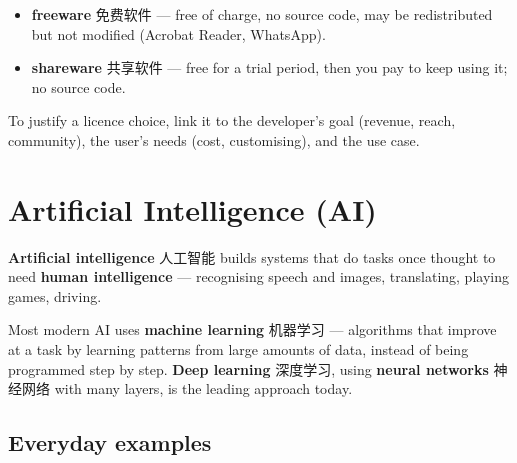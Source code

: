 \documentclass[11pt]{article}
\begin{document}
\begin{itemize}
\item \textbf{freeware} 免费软件 — free of charge, no source code, may be redistributed but not modified (Acrobat Reader, WhatsApp).

\item \textbf{shareware} 共享软件 — free for a trial period, then you pay to keep using it; no source code.

\end{itemize}

\begin{center}
\end{center}

To justify a licence choice, link it to the developer's goal (revenue, reach, community), the user's needs (cost, customising), and the use case.

\section*{Artificial Intelligence (AI)}

\textbf{Artificial intelligence} 人工智能 builds systems that do tasks once thought to need \textbf{human intelligence} — recognising speech and images, translating, playing games, driving.

Most modern AI uses \textbf{machine learning} 机器学习 — algorithms that improve at a task by learning patterns from large amounts of data, instead of being programmed step by step. \textbf{Deep learning} 深度学习, using \textbf{neural networks} 神经网络 with many layers, is the leading approach today.

\subsection*{Everyday examples}
\end{document}
